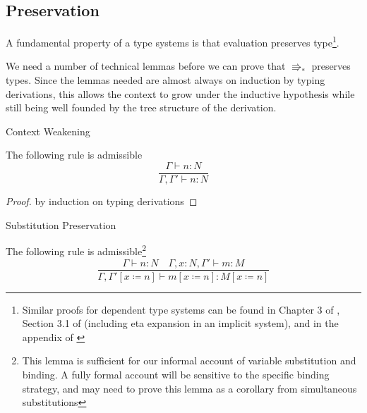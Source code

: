 \subsection{Preservation}

A fundamental property of a type systems is that evaluation preserves
type\footnote{Similar proofs for dependent type systems can be found in Chapter
3 of \cite{luo1994computation}, Section 3.1 of \cite{10.1007/3-540-45413-6_27}(including
eta expansion in an implicit system), and in the appendix of \cite{sjoberg2012irrelevance}}.

We need a number of technical lemmas before we can prove that $\Rrightarrow_{\ast}$
preserves types. Since the lemmas needed are almost always on induction
by typing derivations, this allows the context to grow under the inductive
hypothesis while still being well founded by the tree structure of
the derivation. 

\begin{thm}
Context Weakening

The following rule is admissible
\[
\frac{\Gamma\vdash n:N}{\Gamma,\Gamma'\vdash n:N}
\]
\end{thm}

\begin{proof}
by induction on typing derivations
\end{proof}
\begin{lem}
Substitution Preservation

The following rule is admissible\footnote{This lemma is sufficient for our informal account of variable substitution
and binding. A fully formal account will be sensitive to the specific
binding strategy, and may need to prove this lemma as a corollary
from simultaneous substitutions}
\[
\frac{\Gamma\vdash n:N\quad\Gamma,x:N,\Gamma'\vdash m:M}{\Gamma,\Gamma'\left[x\coloneqq n\right]\vdash m\left[x\coloneqq n\right]:M\left[x\coloneqq n\right]}
\]
\end{lem}

